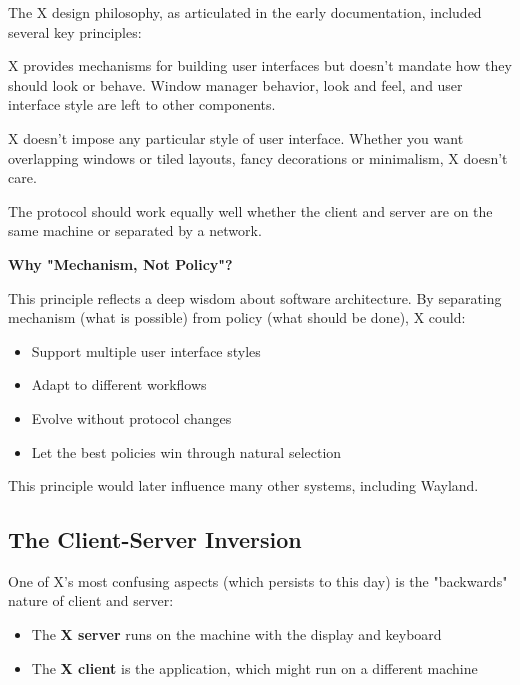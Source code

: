 The X design philosophy, as articulated in the early documentation, included several key principles:

\begin{principle}
X provides mechanisms for building user interfaces but doesn't mandate how they should look or behave. Window manager behavior, look and feel, and user interface style are left to other components.
\end{principle}

\begin{principle}
X doesn't impose any particular style of user interface. Whether you want overlapping windows or tiled layouts, fancy decorations or minimalism, X doesn't care.
\end{principle}

\begin{principle}
The protocol should work equally well whether the client and server are on the same machine or separated by a network.
\end{principle}

\begin{designbox}
\textbf{Why "Mechanism, Not Policy"?}

This principle reflects a deep wisdom about software architecture. By separating mechanism (what is possible) from policy (what should be done), X could:

\begin{itemize}
    \item Support multiple user interface styles
    \item Adapt to different workflows
    \item Evolve without protocol changes
    \item Let the best policies win through natural selection
\end{itemize}

This principle would later influence many other systems, including Wayland.
\end{designbox}

\subsection{The Client-Server Inversion}

One of X's most confusing aspects (which persists to this day) is the "backwards" nature of client and server:

\begin{itemize}[leftmargin=*]
    \item The \textbf{X server} runs on the machine with the display and keyboard
    \item The \textbf{X client} is the application, which might run on a different machine
\end{itemize}

